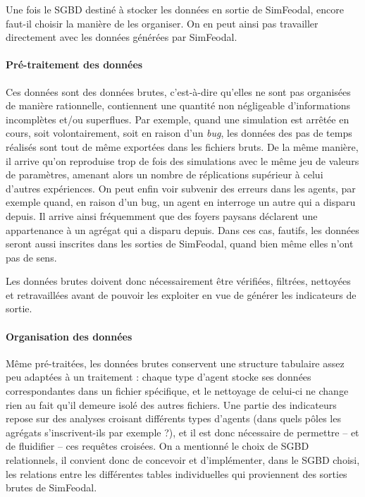 	Une fois le SGBD destiné à stocker les données en sortie de SimFeodal, encore faut-il choisir la manière de les organiser.
	On en peut ainsi pas travailler directement avec les données générées par SimFeodal.

	\paragraph*{Pré-traitement des données}
	Ces données sont des données \og brutes\fg{}, c'est-à-dire qu'elles ne sont pas organisées de manière rationnelle, contiennent une quantité non négligeable d'informations incomplètes et/ou superflues.
	Par exemple, quand une simulation est arrêtée en cours, soit volontairement, soit en raison d'un \textit{bug}, les données des pas de temps réalisés sont tout de même exportées dans les fichiers bruts.
	De la même manière, il arrive qu'on reproduise trop de fois des simulations avec le même jeu de valeurs de paramètres, amenant alors un nombre de réplications supérieur à celui d'autres expériences.
	On peut enfin voir subvenir des erreurs dans les agents, par exemple quand, en raison d'un bug, un agent en interroge un autre qui a disparu depuis.
	Il arrive ainsi fréquemment que des foyers paysans déclarent une appartenance à un agrégat qui a disparu depuis.
	Dans ces cas, fautifs, les données seront aussi inscrites dans les sorties de SimFeodal, quand bien même elles n'ont pas de sens.

	Les données brutes doivent donc nécessairement être vérifiées, filtrées, nettoyées et retravaillées avant de pouvoir les exploiter en vue de générer les indicateurs de sortie.

	\paragraph*{Organisation des données}
	Même pré-traitées, les données brutes conservent une structure tabulaire assez peu adaptées à un traitement : chaque type d'agent stocke ses données correspondantes dans un fichier spécifique, et le nettoyage de celui-ci ne change rien au fait qu'il demeure isolé des autres fichiers.
	Une partie des indicateurs repose sur des analyses croisant différents types d'agents (dans quels pôles les agrégats s'inscrivent-ils par exemple ?), et il est donc nécessaire de permettre -- et de fluidifier -- ces requêtes croisées.
	On a mentionné le choix de SGBD relationnels, il convient donc de concevoir et d'implémenter, dans le SGBD choisi, les relations entre les différentes tables individuelles qui proviennent des sorties brutes de SimFeodal.




